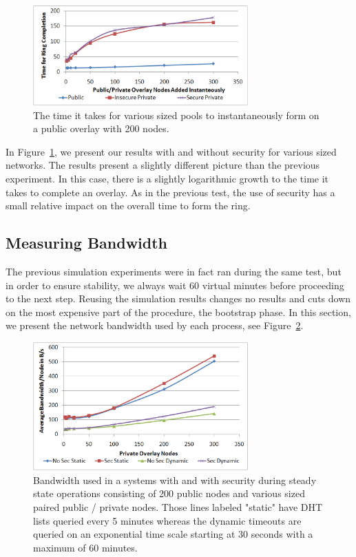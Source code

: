 \documentclass[conference]{IEEEtran}
\begin{document}
\begin{figure}[h]
\centering
\includegraphics[width=3.25in]{mass_join.eps}
\caption{The time it takes for various sized pools to instantaneously form
on a public overlay with 200 nodes.}
\label{fig:big_join}
\end{figure}

In Figure~\ref{fig:big_join}, we present our results with and without security
for various sized networks.  The results present a slightly different picture
than the previous experiment.  In this case, there is a slightly logarithmic
growth to the time it takes to complete an overlay.  As in the previous test,
the use of security has a small relative impact on the overall time to
form the ring.

\subsection{Measuring Bandwidth}
The previous simulation experiments were in fact ran during the same test, but
in order to ensure stability, we always wait 60 virtual minutes before proceeding
to the next step.  Reusing the simulation results changes no results and cuts
down on the most expensive part of the procedure, the bootstrap phase.  In this
section, we present the network bandwidth used by each process, see
Figure~\ref{fig:bandwidth}.

\begin{figure}[h]
\centering
\includegraphics[width=3.25in]{bandwidth.eps}
\caption{Bandwidth used in a systems with and with security during steady state
operations consisting of 200 public nodes and various sized paired public /
private nodes.  Those lines labeled "static" have DHT lists queried every 5
minutes whereas the dynamic timeouts are queried on an exponential time scale
starting at 30 seconds with a maximum of 60 minutes.}
\label{fig:bandwidth}
\end{figure}
\end{document}
